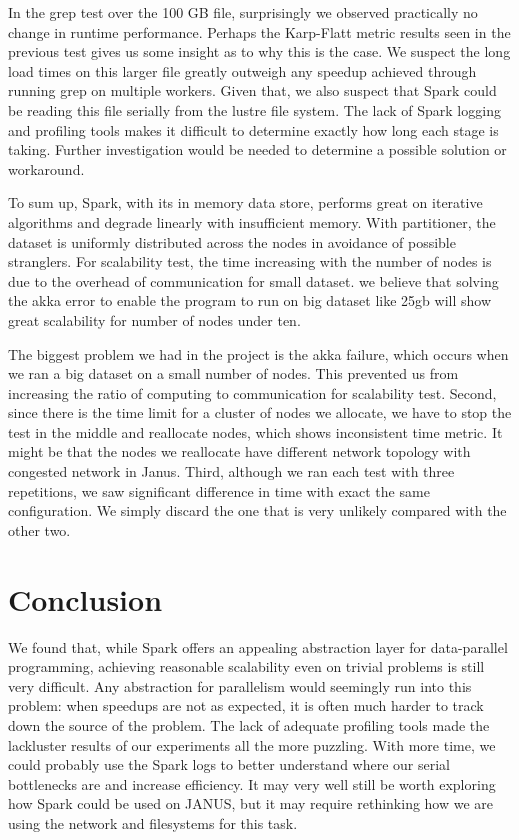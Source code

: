\documentclass{article}
\begin{document}
In the grep test over the 100 GB file, surprisingly we observed practically no
change in runtime performance. Perhaps the Karp-Flatt metric results seen in the
previous test gives us some insight as to why this is the case. We suspect the
long load times on this larger file greatly outweigh any speedup achieved
through running grep on multiple workers. Given that, we also suspect that
Spark could be reading this file serially from the lustre file system. The
lack of Spark logging and profiling tools makes it difficult to determine
exactly how long each stage is taking. Further investigation would be needed
to determine a possible solution or workaround.

To sum up, Spark, with its in memory data store, performs great on iterative algorithms and degrade linearly with insufficient memory. With partitioner, the dataset is uniformly distributed across the nodes in avoidance of possible stranglers. For scalability test, the time increasing with the number of nodes is due to the overhead of communication for small dataset. we believe that solving the akka error to enable the program to run on big dataset like 25gb will show great scalability for number of nodes under ten. 

The biggest problem we had in the project is the akka failure, which occurs when we ran a big dataset on a small number of nodes. This prevented us from increasing the ratio of computing to communication for scalability test. Second, since there is the time limit for a cluster of nodes we allocate, we have to stop the test in the middle and reallocate nodes, which shows inconsistent time metric. It might be that the nodes we reallocate have different network topology with congested network in Janus. Third, although we ran each test with three repetitions, we saw significant difference in time with exact the same configuration. We simply discard the one that is very unlikely compared with the other two.





\section{Conclusion}
We found that, while Spark offers an appealing abstraction layer for
data-parallel programming, achieving reasonable scalability even on trivial
problems is still very difficult. Any abstraction for parallelism would
seemingly run into this problem: when speedups are not as expected, it is often
much harder to track down the source of the problem.  The lack of adequate
profiling tools made the lackluster results of our experiments all the more
puzzling. With more time, we could probably use the Spark logs to better
understand where our serial bottlenecks are and increase efficiency. It may
very well still be worth exploring how Spark could be used on JANUS, but it may
require rethinking how we are using the network and filesystems for this task.



\end{document}
